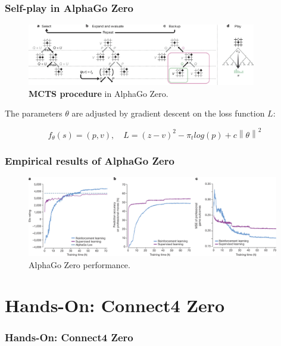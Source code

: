 \documentclass[10pt]{beamer}
\newcommand{\norm}[1]{\left\lVert#1\right\rVert}
\begin{document}
\begin{frame}
	\frametitle{Self-play in AlphaGo Zero}
	
	\begin{figure}[H]
		\centering
		\includegraphics[width=10cm]{alpha-zero-mcts.png}
		\caption{\textbf{MCTS procedure} in AlphaGo Zero.\cite{Silver_2016}}
		\label{fig:alpha-zero-mcts}
	\end{figure}
	
	The parameters $\theta$ are adjusted by gradient descent on the loss function $L$:

	\begin{equation}
		f_\theta(s) = (p,v),\quad L = (z-v)^2 - \pi_t log(p) + c \norm{\theta}^2
	\end{equation}

\end{frame}


\begin{frame}
	\frametitle{Empirical results of AlphaGo Zero}
	
	\begin{figure}[H]
		\centering
		\includegraphics[width=11cm,trim={0px 0px 0px 45px},clip]{alpha-go-zero_empirical_results.png}
		\caption{AlphaGo Zero performance. \cite{Silver_2016}}
	\end{figure}

\end{frame}


\section{Hands-On: Connect4 Zero}

\begin{frame}
	\frametitle{Hands-On: Connect4 Zero}
	
	\tableofcontents[ 
	currentsubsection, 
	hideothersubsections, 
	sectionstyle=show/shaded,
	]
	
\end{frame}
\end{document}
